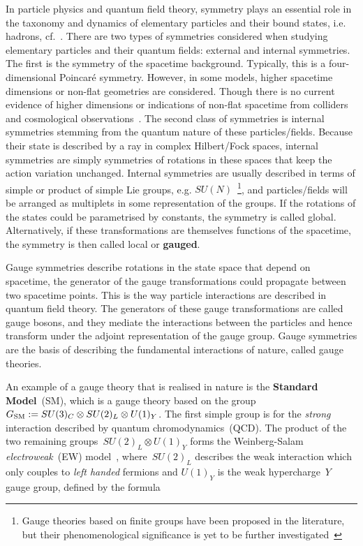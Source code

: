 \par In particle physics and quantum field theory, symmetry plays an essential role in the taxonomy and dynamics of elementary particles and their bound states, i.e. hadrons, cf.~\cite{osti_4008239,PhysRev.96.191}. There are two types of symmetries considered when studying elementary particles and their quantum fields: external and internal symmetries. The first is the symmetry of the spacetime background. Typically, this is a four-dimensional Poincar\'e symmetry. However, in some models, higher spacetime dimensions or non-flat geometries are considered. Though there is no current evidence of higher dimensions or indications of non-flat spacetime from colliders and cosmological observations~\cite{Zyla:2020zbs}. The second class of symmetries is internal symmetries stemming from the quantum nature of these particles/fields. Because their state is described by a {ray} in complex Hilbert/Fock spaces, internal symmetries are simply symmetries of rotations in these spaces that keep the action variation unchanged. Internal symmetries are usually described in terms of simple or product of simple {Lie groups}, e.g. $SU(N)$~\footnote{Gauge theories based on finite groups have been proposed in the literature, but their phenomenological significance is yet to be further investigated~\cite{Freed1993LecturesOT,dijkgraaf1990topological}}, and particles/fields will be arranged as multiplets in some representation of the groups. If the rotations of the states could be parametrised by constants, the symmetry is called {global}. Alternatively, if these transformations are themselves functions of the spacetime,  the symmetry is then called {local} or \textbf{gauged}.
\par Gauge symmetries describe rotations in the state space that depend on spacetime, the generator of the gauge transformations could propagate between two spacetime points. This is the way particle interactions are described in quantum field theory. The generators of these gauge transformations are called gauge bosons, and they mediate the interactions between the particles and hence transform under the adjoint representation of the gauge group. Gauge symmetries are the basis of describing the fundamental interactions of nature,  called gauge theories.
\par An example of a gauge theory that is realised in nature is the \textbf{Standard Model}~(SM), which is a gauge theory based on the group~$G_{\mathrm{SM}}:=SU(3)_C \otimes SU(2)_L \otimes U(1)_Y$. The first simple group is for the \textit{strong} interaction described by quantum chromodynamics~(QCD). The product of the two remaining groups~$SU(2)_L \otimes U(1)_Y$ forms the Weinberg-Salam \textit{electroweak}~(EW) model~\cite{salam1,salam2,PhysRevLett.19.1264}, where~$SU(2)_L$ describes the weak interaction which only couples to \emph{left handed} fermions and $U(1)_Y$ is the weak hypercharge~$Y$ gauge group, defined by the formula
